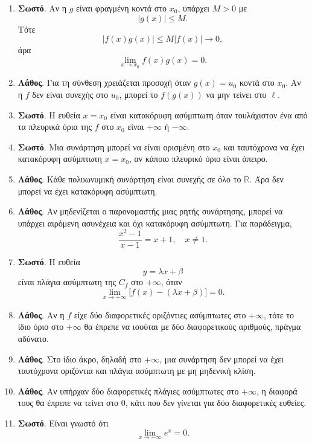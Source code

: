 \begin{enumerate}[label=\textbf{1.\arabic*.}]
\item \textbf{Σωστό}. Αν η $g$ είναι φραγμένη κοντά στο $x_0$, υπάρχει $M>0$ με
\[
|g(x)|\leq M.
\]
Τότε
\[
|f(x)g(x)|\leq M|f(x)|\to0,
\]
άρα
\[
\lim_{x\to x_0}f(x)g(x)=0.
\]

\item \textbf{Λάθος}. Για τη σύνθεση χρειάζεται προσοχή όταν $g(x)=u_0$ κοντά στο $x_0$. Αν η $f$ δεν είναι συνεχής στο $u_0$, μπορεί το $f(g(x))$ να μην τείνει στο $\ell$.

\item \textbf{Σωστό}. Η ευθεία $x=x_0$ είναι κατακόρυφη ασύμπτωτη όταν τουλάχιστον ένα από τα πλευρικά όρια της $f$ στο $x_0$ είναι $+\infty$ ή $-\infty$.

\item \textbf{Σωστό}. Μια συνάρτηση μπορεί να είναι ορισμένη στο $x_0$ και ταυτόχρονα να έχει κατακόρυφη ασύμπτωτη $x=x_0$, αν κάποιο πλευρικό όριο είναι άπειρο.

\item \textbf{Λάθος}. Κάθε πολυωνυμική συνάρτηση είναι συνεχής σε όλο το $\mathbb{R}$. Άρα δεν μπορεί να έχει κατακόρυφη ασύμπτωτη.

\item \textbf{Λάθος}. Αν μηδενίζεται ο παρονομαστής μιας ρητής συνάρτησης, μπορεί να υπάρχει αιρόμενη ασυνέχεια και όχι κατακόρυφη ασύμπτωτη. Για παράδειγμα,
\[
\frac{x^2-1}{x-1}=x+1,\quad x\neq1.
\]

\item \textbf{Σωστό}. Η ευθεία
\[
y=\lambda x+\beta
\]
είναι πλάγια ασύμπτωτη της $C_f$ στο $+\infty$, όταν
\[
\lim_{x\to+\infty}\bigl[f(x)-(\lambda x+\beta)\bigr]=0.
\]

\item \textbf{Λάθος}. Αν η $f$ είχε δύο διαφορετικές οριζόντιες ασύμπτωτες στο $+\infty$, τότε το ίδιο όριο στο $+\infty$ θα έπρεπε να ισούται με δύο διαφορετικούς αριθμούς, πράγμα αδύνατο.

\item \textbf{Λάθος}. Στο ίδιο άκρο, δηλαδή στο $+\infty$, μια συνάρτηση δεν μπορεί να έχει ταυτόχρονα οριζόντια και πλάγια ασύμπτωτη με μη μηδενική κλίση.

\item \textbf{Λάθος}. Αν υπήρχαν δύο διαφορετικές πλάγιες ασύμπτωτες στο $+\infty$, η διαφορά τους θα έπρεπε να τείνει στο $0$, κάτι που δεν γίνεται για δύο διαφορετικές ευθείες.

\item \textbf{Σωστό}. Είναι γνωστό ότι
\[
\lim_{x\to-\infty}e^x=0.
\]


\end{enumerate}
